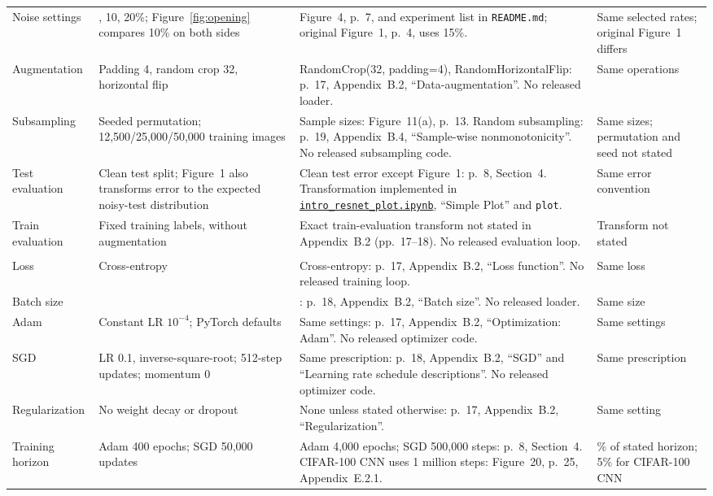 \begin{longtable}{@{}>{\raggedright\arraybackslash}p{}>{\raggedright\arraybackslash}p{}>{\raggedright\arraybackslash}p{}>{\raggedright\arraybackslash}p{}@{}}
Noise settings & 0, 10, 20\%; Figure~\ref{fig:opening} compares 10\% on both sides & Figure~4, p.~7, and experiment list in \texttt{README.md}; original Figure~1, p.~4, uses 15\%. & Same selected rates; original Figure~1 differs\\
Augmentation & Padding 4, random crop 32, horizontal flip & RandomCrop(32, padding=4), RandomHorizontalFlip: p.~17, Appendix~B.2, ``Data-augmentation''. No released loader. & Same operations\\
Subsampling & Seeded permutation; 12,500/25,000/50,000 training images & Sample sizes: Figure~11(a), p.~13. Random subsampling: p.~19, Appendix~B.4, ``Sample-wise nonmonotonicity''. No released subsampling code. & Same sizes; permutation and seed not stated\\
Test evaluation & Clean test split; Figure~1 also transforms error to the expected noisy-test distribution & Clean test error except Figure~1: p.~8, Section~4. Transformation implemented in \href{https://gitlab.com/harvard-machine-learning/double-descent/-/blob/0d653296f870e6bf7ee82dc71b4f7b49d53fa85d/intro_resnet_plot.ipynb}{\texttt{intro\_resnet\_plot.ipynb}}, ``Simple Plot'' and \texttt{plot}. & Same error convention\\
Train evaluation & Fixed training labels, without augmentation & Exact train-evaluation transform not stated in Appendix~B.2 (pp.~17--18). No released evaluation loop. & Transform not stated\\
\midrule
\multicolumn{4}{l}{\textbf{Training}}\\
Loss & Cross-entropy & Cross-entropy: p.~17, Appendix~B.2, ``Loss function''. No released training loop. & Same loss\\
Batch size & 128 & 128: p.~18, Appendix~B.2, ``Batch size''. No released loader. & Same size\\
Adam & Constant LR $10^{-4}$; PyTorch defaults & Same settings: p.~17, Appendix~B.2, ``Optimization: Adam''. No released optimizer code. & Same settings\\
SGD & LR 0.1, inverse-square-root; 512-step updates; momentum 0 & Same prescription: p.~18, Appendix~B.2, ``SGD'' and ``Learning rate schedule descriptions''. No released optimizer code. & Same prescription\\
Regularization & No weight decay or dropout & None unless stated otherwise: p.~17, Appendix~B.2, ``Regularization''. & Same setting\\
Training horizon & Adam 400 epochs; SGD 50,000 updates & Adam 4,000 epochs; SGD 500,000 steps: p.~8, Section~4. CIFAR-100 CNN uses 1 million steps: Figure~20, p.~25, Appendix~E.2.1. & 10\% of stated horizon; 5\% for CIFAR-100 CNN\\

\end{longtable}
